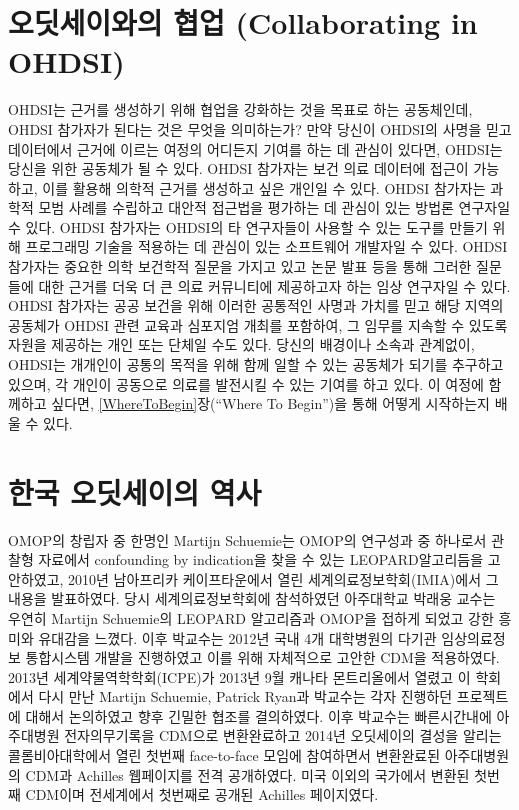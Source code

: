 \documentclass[11pt]{book}
\theoremstyle{definition}
\theoremstyle{definition}
\theoremstyle{definition}
\theoremstyle{remark}
\begin{document}
\section{오딧세이와의 협업 (Collaborating in
OHDSI)}\label{--collaborating-in-ohdsi}

OHDSI는 근거를 생성하기 위해 협업을 강화하는 것을 목표로 하는
공동체인데, OHDSI 참가자가 된다는 것은 무엇을 의미하는가? 만약 당신이
OHDSI의 사명을 믿고 데이터에서 근거에 이르는 여정의 어디든지 기여를 하는
데 관심이 있다면, OHDSI는 당신을 위한 공동체가 될 수 있다. OHDSI
참가자는 보건 의료 데이터에 접근이 가능하고, 이를 활용해 의학적 근거를
생성하고 싶은 개인일 수 있다. OHDSI 참가자는 과학적 모범 사례를 수립하고
대안적 접근법을 평가하는 데 관심이 있는 방법론 연구자일 수 있다. OHDSI
참가자는 OHDSI의 타 연구자들이 사용할 수 있는 도구를 만들기 위해
프로그래밍 기술을 적용하는 데 관심이 있는 소프트웨어 개발자일 수 있다.
OHDSI 참가자는 중요한 의학 보건학적 질문을 가지고 있고 논문 발표 등을
통해 그러한 질문들에 대한 근거를 더욱 더 큰 의료 커뮤니티에 제공하고자
하는 임상 연구자일 수 있다. OHDSI 참가자는 공공 보건을 위해 이러한
공통적인 사명과 가치를 믿고 해당 지역의 공동체가 OHDSI 관련 교육과
심포지엄 개최를 포함하여, 그 임무를 지속할 수 있도록 자원을 제공하는
개인 또는 단체일 수도 있다. 당신의 배경이나 소속과 관계없이, OHDSI는
개개인이 공통의 목적을 위해 함께 일할 수 있는 공동체가 되기를 추구하고
있으며, 각 개인이 공동으로 의료를 발전시킬 수 있는 기여를 하고 있다. 이
여정에 함께하고 싶다면, \ref{WhereToBegin}장(``Where To Begin'')을 통해
어떻게 시작하는지 배울 수 있다.

\section{한국 오딧세이의 역사}\label{--}

OMOP의 창립자 중 한명인 Martijn Schuemie는 OMOP의 연구성과 중 하나로서
관찰형 자료에서 confounding by indication을 찾을 수 있는
LEOPARD알고리듬을 고안하였고, 2010년 남아프리카 케이프타운에서 열린
세계의료정보학회(IMIA)에서 그 내용을 발표하였다. 당시 세계의료정보학회에
참석하였던 아주대학교 박래웅 교수는 우연히 Martijn Schuemie의 LEOPARD
알고리즘과 OMOP을 접하게 되었고 강한 흥미와 유대감을 느꼈다. 이후
박교수는 2012년 국내 4개 대학병원의 다기관 임상의료정보 통합시스템
개발을 진행하였고 이를 위해 자체적으로 고안한 CDM을 적용하였다. 2013년
세계약물역학학회(ICPE)가 2013년 9월 캐나타 몬트리올에서 열렸고 이
학회에서 다시 만난 Martijn Schuemie, Patrick Ryan과 박교수는 각자
진행하던 프로젝트에 대해서 논의하였고 향후 긴밀한 협조를 결의하였다.
이후 박교수는 빠른시간내에 아주대병원 전자의무기록을 CDM으로
변환완료하고 2014년 오딧세이의 결성을 알리는 콜롬비아대학에서 열린
첫번째 face-to-face 모임에 참여하면서 변환완료된 아주대병원의 CDM과
Achilles 웹페이지를 전격 공개하였다. 미국 이외의 국가에서 변환된 첫번째
CDM이며 전세계에서 첫번째로 공개된 Achilles 페이지였다.
\end{document}
